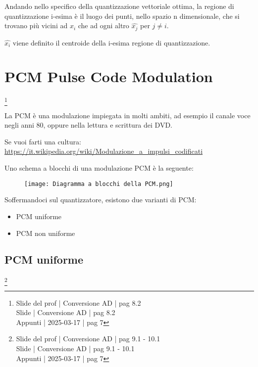 Andando nello specifico della quantizzazione vettoriale ottima, 
la regione di quantizzazione i-esima è il luogo dei punti, nello spazio n dimensionale, 
che si trovano più vicini ad $\hat{x_i}$ che ad ogni altro $\hat{x_j}$ per $j \neq i$. \newline 

$\hat{x_i}$ viene definito il centroide della i-esima regione di quantizzazione. \newline 

\newpage 

\section{PCM Pulse Code Modulation}
\footnote{Slide del prof | Conversione AD | pag 8.2\\  
Slide | Conversione AD | pag 8.2\\
Appunti | 2025-03-17 | pag 7
}

La PCM è una modulazione impiegata in molti ambiti, ad esempio il canale voce negli anni 80, oppure nella lettura e scrittura dei DVD. \newline 

\begin{tcolorbox}
    Se vuoi farti una cultura: \\
    \url{https://it.wikipedia.org/wiki/Modulazione_a_impulsi_codificati}
\end{tcolorbox}

Uno schema a blocchi di una modulazione PCM è la seguente: 

\begin{figure}[h]
    \centering
    \texttt{[image: Diagramma a blocchi della PCM.png]}
\end{figure}

Soffermandoci sul quantizzatore, esistono due varianti di PCM: 

\begin{itemize}
    \item PCM uniforme
    \item PCM non uniforme
\end{itemize}

\newpage 

\subsection{PCM uniforme}
\footnote{Slide del prof | Conversione AD | pag 9.1 - 10.1\\  
Slide | Conversione AD | pag 9.1 - 10.1\\
Appunti | 2025-03-17 | pag 7 
}


